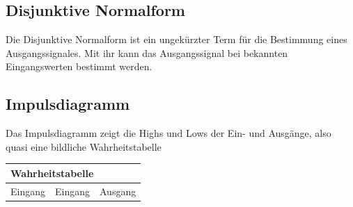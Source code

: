 \documentclass[12pt,a4paper]{article}
\begin{document}
\subsection{Disjunktive Normalform}
    Die Disjunktive Normalform ist ein ungekürzter Term für die Bestimmung eines Ausgangssignales. Mit ihr kann das Ausgangssignal bei bekannten Eingangswerten bestimmt werden.

\subsection{Impulsdiagramm}
    Das Impulsdiagramm zeigt die Highs und Lows der Ein- und Ausgänge, also quasi eine bildliche Wahrheitstabelle
    \begin{center}
        \begin{minipage}{.45\textwidth}
            \begin{center}
            \end{center}
        \end{minipage}	   
        \hspace{.5cm}
        \begin{minipage}{.45\textwidth}
            \begin{center}
                \renewcommand{\arraystretch}{1.7}
                \begin{tabularx}{\columnwidth}{|X|X|X|}
                    \hline
                    \multicolumn{3}{|l|}{Wahrheitstabelle}\\
                    \hline
                    Eingang&Eingang&Ausgang \\

\end{tabularx}
\end{center}
\end{minipage}
\end{center}
\end{document}
